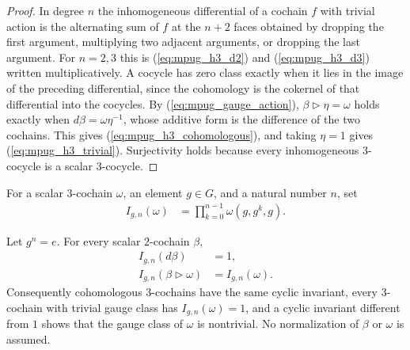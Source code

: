 \begin{proof}\leanok
    In degree $n$ the inhomogeneous differential of a cochain $f$ with
    trivial action is the alternating sum of $f$ at the $n+2$ faces
    obtained by dropping the first argument, multiplying two adjacent
    arguments, or dropping the last argument. For $n=2,3$ this is
    (\ref{eq:mpug_h3_d2}) and (\ref{eq:mpug_h3_d3}) written multiplicatively.
    A cocycle has zero class exactly when it lies in the image of the
    preceding differential, since the cohomology is the cokernel of that
    differential into the cocycles. By (\ref{eq:mpug_gauge_action}),
    $\beta\mathbin{\triangleright}\eta=\omega$ holds exactly when
    $d\beta=\omega\eta^{-1}$, whose additive form is the difference of the
    two cochains. This gives (\ref{eq:mpug_h3_cohomologous}), and taking
    $\eta=1$ gives (\ref{eq:mpug_h3_trivial}). Surjectivity holds because
    every inhomogeneous $3$-cocycle is a scalar $3$-cocycle.
\end{proof}

\begin{definition}
    \label{def:mpug_cyclic_invariant}
    \leanok
    For a scalar $3$-cochain $\omega$, an element $g\in G$, and a natural
    number $n$, set
    \begin{align}
        I_{g,n}(\omega)
         & =\prod_{k=0}^{n-1}\omega(g,g^k,g).
        \label{eq:mpug_cyclic_invariant}
    \end{align}
\end{definition}

\begin{lemma}
    \label{thm:mpug_cyclic_invariant_gauge}
    \leanok
    Let $g^n=e$. For every scalar $2$-cochain $\beta$,
    \begin{align}
        I_{g,n}(d\beta)                              & =1,               \\
        I_{g,n}(\beta\mathbin{\triangleright}\omega) & =I_{g,n}(\omega).
    \end{align}
    Consequently cohomologous $3$-cochains have the same cyclic invariant,
    every $3$-cochain with trivial gauge class has $I_{g,n}(\omega)=1$, and a
    cyclic invariant different from $1$ shows that the gauge class of
    $\omega$ is nontrivial. No normalization of $\beta$ or $\omega$ is
    assumed.
\end{lemma}

